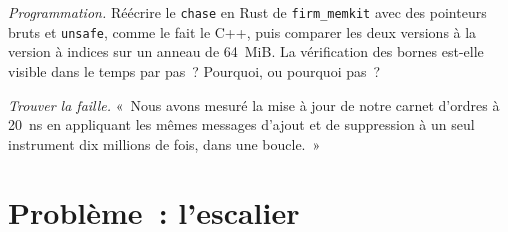 \begin{exercise}[$\star\star\star$]\label{exo:ll:memory-hierarchy-and-caches:7}
\emph{Programmation.} Réécrire le \texttt{chase} en Rust de \texttt{firm\_memkit} avec des pointeurs bruts et \texttt{unsafe}, comme le fait le C++,
puis comparer les deux versions à la version à indices sur un anneau de 64~MiB. La vérification des bornes est-elle visible dans le temps par pas~? Pourquoi,
ou pourquoi pas~?
\end{exercise}

\begin{exercise}[$\star\star\star$]\label{exo:ll:memory-hierarchy-and-caches:8}
\emph{Trouver la faille.} «~Nous avons mesuré la mise à jour de notre carnet d'ordres à \qty{20}{\nano\second} en appliquant les mêmes messages d'ajout et
de suppression à un seul instrument dix millions de fois, dans une boucle.~»
\end{exercise}

\section{Problème~: l'escalier}

